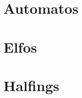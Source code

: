\begin{multicols}{2}
\section{Automatos}%

\section{Elfos}%

\section{Halfings}%

    \end{multicols}

